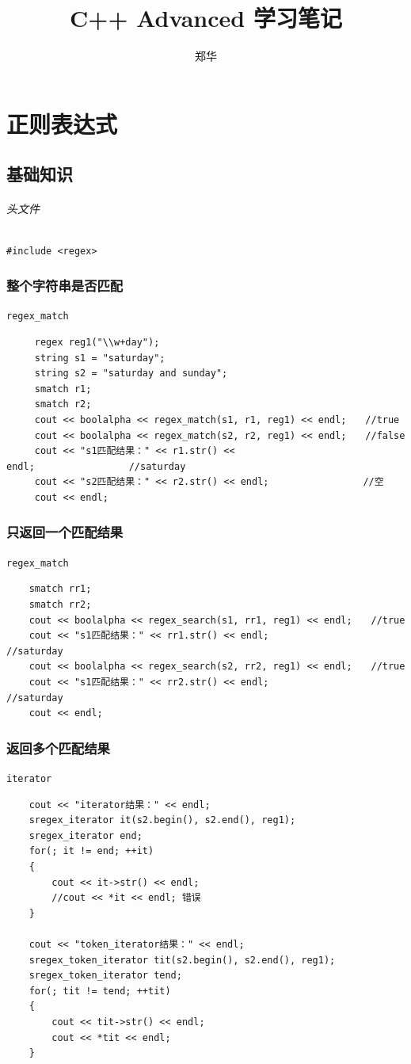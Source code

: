 \documentclass[UTF8,a4paper,12pt]{ctexbook}
\author{\kaishu 郑华}
\title{ \textbf{C++ Advanced 学习笔记\textbf{}}}
\begin{document}
 	\maketitle
	\tableofcontents

\chapter{正则表达式}
	\section{基础知识}
		\subparagraph{头文件} \verb|#include <regex>|
		
		\subsection{整个字符串是否匹配} \verb|regex_match|
			\begin{lstlisting}
	 regex reg1("\\w+day");
	 string s1 = "saturday";
	 string s2 = "saturday and sunday";
	 smatch r1;
	 smatch r2;
	 cout << boolalpha << regex_match(s1, r1, reg1) << endl;　　//true
	 cout << boolalpha << regex_match(s2, r2, reg1) << endl;　　//false
	 cout << "s1匹配结果：" << r1.str() << endl;　　　　　　　　　　//saturday
	 cout << "s2匹配结果：" << r2.str() << endl;　　　　　　　　　　//空
	 cout << endl;
			\end{lstlisting}
		\subsection{只返回一个匹配结果} \verb|regex_match|
			\begin{lstlisting}
	smatch rr1;
	smatch rr2;
	cout << boolalpha << regex_search(s1, rr1, reg1) << endl;　　//true
	cout << "s1匹配结果：" << rr1.str() << endl; 　　　　　　　　　　//saturday
	cout << boolalpha << regex_search(s2, rr2, reg1) << endl;　　//true
	cout << "s1匹配结果：" << rr2.str() << endl;　　　　　　　　　　 //saturday
	cout << endl;
			\end{lstlisting}
		
		\subsection{返回多个匹配结果} \verb|iterator|
			\begin{lstlisting}
	cout << "iterator结果：" << endl;
	sregex_iterator it(s2.begin(), s2.end(), reg1);
	sregex_iterator end;
	for(; it != end; ++it)
	{
		cout << it->str() << endl;
		//cout << *it << endl; 错误
	}
	
	cout << "token_iterator结果：" << endl;
	sregex_token_iterator tit(s2.begin(), s2.end(), reg1);
	sregex_token_iterator tend;
	for(; tit != tend; ++tit)
	{
		cout << tit->str() << endl;
		cout << *tit << endl;
	}
			\end{lstlisting}
			
\end{document}
